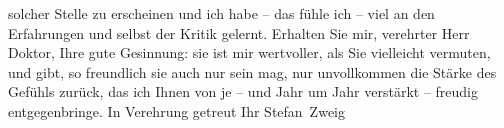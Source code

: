                solcher Stelle zu erscheinen und ich habe – {\pb}das fühle ich – viel an den Erfahrungen
               und selbst der Kritik gelernt. Erhalten Sie mir, verehrter Herr Doktor, Ihre gute
               Gesinnung: sie ist mir wertvoller, als Sie vielleicht vermuten, und gibt, so
               freundlich sie auch nur sein mag, nur unvollkommen die Stärke des Gefühls zurück, das
               ich Ihnen von je – und Jahr um Jahr verstärkt – freudig entgegenbringe. In Verehrung
               getreut Ihr\pend
           \pstart \spacefill\mbox{Stefan Zweig}\pend{}\endnumbering{}
\begin{anhang}
\end{anhang}
      